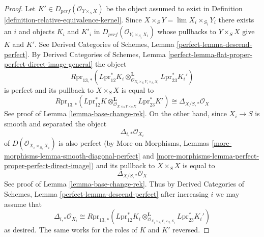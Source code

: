 \documentclass{stacks-project}
\theoremstyle{plain}
\theoremstyle{definition}
\theoremstyle{remark}
\numberwithin{equation}{subsection}
\def\lim{\mathop{\mathrm{lim}}\nolimits}
\begin{document}
\begin{proof}
Let $K' \in D_{perf}(\mathcal{O}_{Y \times_S X})$ be the object assumed to
exist in Definition \ref{definition-relative-equivalence-kernel}.
Since $X \times_S Y = \lim X_i \times_{S_i} Y_i$ there exists an
$i$ and objects $K_i$ and $K'_i$ in
$D_{perf}(\mathcal{O}_{Y_i \times_{S_i} X_i})$
whose pullbacks to $Y \times_S X$ give $K$ and $K'$.
See Derived Categories of Schemes, Lemma \ref{perfect-lemma-descend-perfect}.
By Derived Categories of Schemes, Lemma
\ref{perfect-lemma-flat-proper-perfect-direct-image-general}
the object
$$
R\text{pr}_{13, *}(L\text{pr}_{12}^*K_i
\otimes_{\mathcal{O}_{X_i \times_{S_i} Y_i \times_{S_i} X_i}}^\mathbf{L}
L\text{pr}_{23}^*K_i')
$$
is perfect and its pullback to $X \times_S X$ is equal to
$$
R\text{pr}_{13, *}(L\text{pr}_{12}^*K
\otimes_{\mathcal{O}_{X \times_S Y \times_S X}}^\mathbf{L}
L\text{pr}_{23}^*K') \cong \Delta_{X/S, *}\mathcal{O}_X
$$
See proof of Lemma \ref{lemma-base-change-rek}.
On the other hand, since $X_i \to S$ is smooth and separated the
object
$$
\Delta_{i, *}\mathcal{O}_{X_i}
$$
of $D(\mathcal{O}_{X_i \times_{S_i} X_i})$ is also perfect
(by More on Morphisms, Lemmas
\ref{more-morphisms-lemma-smooth-diagonal-perfect} and
\ref{more-morphisms-lemma-perfect-proper-perfect-direct-image}) and
its pullback to $X \times_S X$ is equal to
$$
\Delta_{X/S, *}\mathcal{O}_X
$$
See proof of Lemma \ref{lemma-base-change-rek}. Thus by
Derived Categories of Schemes, Lemma \ref{perfect-lemma-descend-perfect}
after increasing $i$ we may assume that
$$
\Delta_{i, *}\mathcal{O}_{X_i} \cong
R\text{pr}_{13, *}(L\text{pr}_{12}^*K_i
\otimes_{\mathcal{O}_{X_i \times_{S_i} Y_i \times_{S_i} X_i}}^\mathbf{L}
L\text{pr}_{23}^*K_i')
$$
as desired. The same works for the roles of $K$ and $K'$ reversed.
\end{proof}
\end{document}
